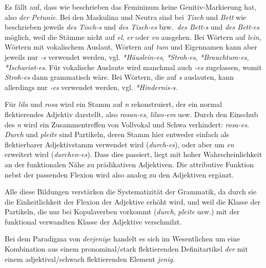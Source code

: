 
Es fällt auf, dass wie beschrieben das Femininum keine Genitiv-Markierung hat, also \textit{der Petunie}.
Bei den Maskulina und Neutra sind bei \textit{Tisch} und \textit{Bett} wie beschrieben jeweils \textit{des Tisch-s} und \textit{des Tisch-es} bzw.\ \textit{des Bett-s} und \textit{des Bett-es} möglich, weil die Stämme nicht auf \textit{el}, \textit{er} oder \textit{en} ausgehen.
Bei Wörtern auf \textit{lein}, Wörtern mit vokalischem Auslaut, Wörtern auf \textit{tum} und Eigennamen kann aber jeweils nur \textit{-s} verwendet werden, vgl. \textit{*Häuslein-es}, \textit{*Stroh-es}, \textit{*Brauchtum-es}, \textit{*Ischariot-es}.
Für vokalische Auslaute wird manchmal auch \textit{-es} zugelassen, womit \textit{Stroh-es} dann grammatisch wäre.
Bei Wörtern, die auf \textit{s} auslauten, kann allerdings nur \textit{-es} verwendet werden, vgl. \textit{*Hindernis-s}.


Für \textit{lila} und \textit{rosa} wird ein Stamm auf \textit{n} rekonstruiert, der ein normal flektierendes Adjektiv darstellt, also \textit{rosan-es}, \textit{lilan-em} usw.
Durch den Einschub des \textit{n} wird ein Zusammentreffen von Vollvokal und Schwa verhindert: \textit{\Ast rosa-es}.\\
\textit{Durch} und \textit{pleite} sind Partikeln, deren Stamm hier entweder einfach als flektierbarer Adjektivstamm verwendet wird (\textit{durch-es}), oder aber um \textit{en} erweitert wird (\textit{durchen-es}).
Dass dies passiert, liegt mit hoher Wahrscheinlichkeit an der funktionalen Nähe zu prädikativen Adjektiven.
Die attributive Funktion nebst der passenden Flexion wird also analog zu den Adjektiven ergänzt.

Alle diese Bildungen verstärken die Systematizität der Grammatik, da durch sie die Einheitlichkeit der Flexion der Adjektive erhöht wird, und weil die Klasse der Partikeln, die nur bei Kopulaverben vorkommt (\textit{durch}, \textit{pleite} usw.) mit der funktional verwandten Klasse der Adjektive verschmilzt.


Bei dem Paradigma von \textit{derjenige} handelt es sich im Wesentlichen um eine Kombination aus einem pronominal\slash stark flektierenden Definitartikel \textit{der} mit einem adjektival\slash schwach flektierenden Element \textit{jenig}.



